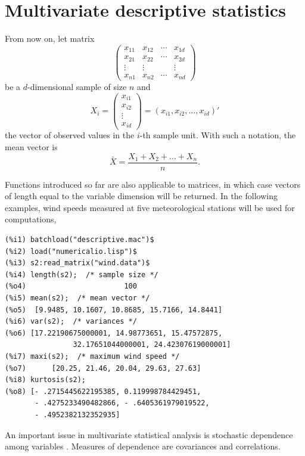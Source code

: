 \documentclass[12pt,a4paper]{article}
\begin{document}
\section{Multivariate descriptive statistics}


From now on, let matrix
\[
\left(
\begin{array}{cccc}
x_{11}  &  x_{12}  &  \cdots  &  x_{1d}  \\
x_{21}  &  x_{22}  &  \cdots  &  x_{2d}  \\
\vdots  &  \vdots  &          &  \vdots  \\
x_{n1}  &  x_{n2}  &  \cdots  &  x_{nd}
\end{array}
\right)
\]
be a $d$-dimensional sample of size $n$ and
\[
X_i =
\left(
\begin{array}{c}
x_{i1}  \\  x_{i2}  \\  \vdots  \\  x_{id}
\end{array}
\right) = (x_{i1}, x_{i2}, \ldots, x_{id})'
\]
the vector of observed values in the $i$-th sample unit. With such a notation, the mean vector is
\[
\bar{X} = \frac{X_1 + X_2 + \ldots +X_n}{n}.
\]


Functions introduced so far are also applicable to matrices, in which case vectors of length equal to the variable dimension will be returned. In the following examples, wind speeds measured at five meteorological stations will be used for computations,
\begin{verbatim}
(%i1) batchload("descriptive.mac")$
(%i2) load("numericalio.lisp")$
(%i3) s2:read_matrix("wind.data")$
(%i4) length(s2);  /* sample size */
(%o4)                       100
(%i5) mean(s2);  /* mean vector */
(%o5)  [9.9485, 10.1607, 10.8685, 15.7166, 14.8441]
(%i6) var(s2);  /* variances */
(%o6) [17.22190675000001, 14.98773651, 15.47572875,
                32.17651044000001, 24.42307619000001]
(%i7) maxi(s2);  /* maximum wind speed */
(%o7)      [20.25, 21.46, 20.04, 29.63, 27.63]
(%i8) kurtosis(s2);
(%o8) [- .2715445622195385, 0.119998784429451,
       - .4275233490482866, - .6405361979019522,
       - .4952382132352935]
\end{verbatim}


An important issue in multivariate statistical analysis is stochastic dependence among variables \cite{john,pena}. Measures of dependence are covariances and correlations.
\end{document}
